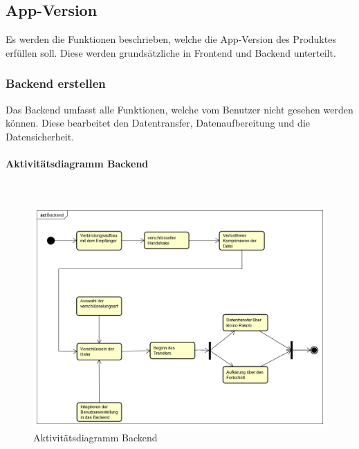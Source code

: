 \subsection{App-Version}
Es werden die Funktionen beschrieben, welche die App-Version des Produktes erfüllen soll. Diese werden grundsätzliche in Frontend und Backend unterteilt.
\subsubsection{Backend erstellen}
Das Backend umfasst alle Funktionen, welche vom Benutzer nicht gesehen werden können. Diese bearbeitet den Datentransfer, Datenaufbereitung und die Datensicherheit.
\paragraph{Aktivitätsdiagramm Backend}\mbox{}\\
\begin{figure}[H]
	\centering
	\includegraphics[width= 0.9\linewidth]{diagramms/activity/Backend.png}
	\caption{Aktivitätsdiagramm Backend}
\end{figure}
\newpage
